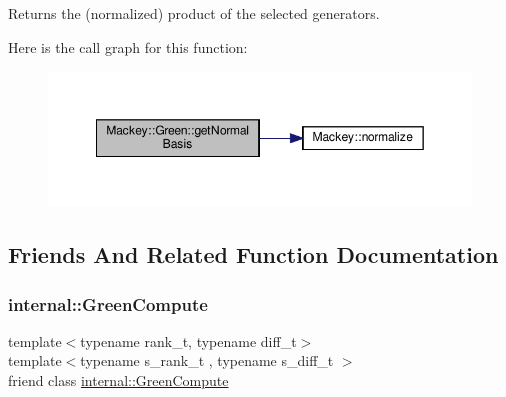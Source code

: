 Returns the (normalized) product of the selected generators. 

Here is the call graph for this function\+:\nopagebreak
\begin{figure}[H]
\begin{center}
\leavevmode
\includegraphics[width=349pt]{classMackey_1_1Green_a3f7f1f3a020f23a00fae372956f50827_cgraph}
\end{center}
\end{figure}


\subsection{Friends And Related Function Documentation}
\mbox{\label{classMackey_1_1Green_aa7a5b52d9d87397db413615120f34df7}} 
\subsubsection{\texorpdfstring{internal\+::\+Green\+Compute}{internal::GreenCompute}}
{\footnotesize\ttfamily template$<$typename rank\+\_\+t, typename diff\+\_\+t$>$ \\
template$<$typename s\+\_\+rank\+\_\+t , typename s\+\_\+diff\+\_\+t $>$ \\
friend class \hyperlink{classMackey_1_1internal_1_1GreenCompute}{internal\+::\+Green\+Compute}\hspace{0.3cm}{\ttfamily [friend]}}

\mbox{\label{classMackey_1_1Green_aeb72946219f32efa8f0a45f5f8872c8a}} 
